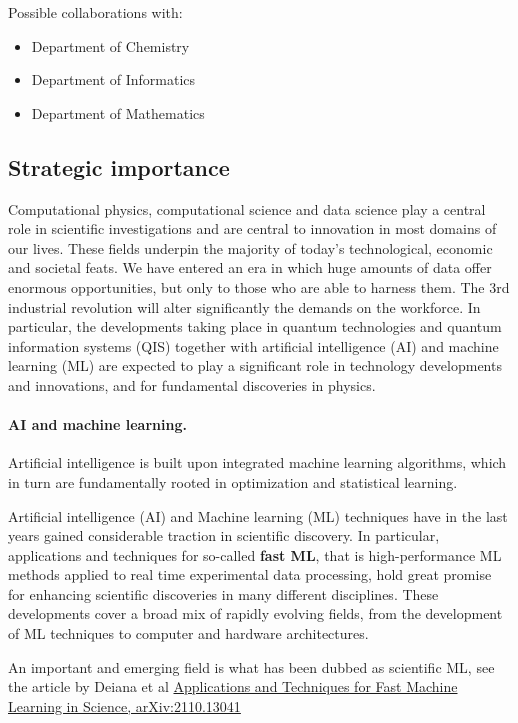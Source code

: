 \documentclass[%
oneside,                 %
final,                   %
10pt]{article}
\begin{document}
Possible collaborations with:

\begin{itemize}
\item Department of Chemistry

\item Department of Informatics

\item Department of Mathematics
\end{itemize}

\noindent
\subsection{Strategic importance}

Computational physics, computational science and data science play a
central role in scientific investigations and are central to
innovation in most domains of our lives. These fields underpin the
majority of today's technological, economic and societal feats. We
have entered an era in which huge amounts of data offer enormous
opportunities, but only to those who are able to harness them. The 3rd
industrial revolution will alter significantly the demands on the
workforce. In particular, the developments taking place in quantum
technologies and quantum information systems (QIS) together with
artificial intelligence (AI) and machine learning (ML) are expected to
play a significant role in technology developments and innovations,
and for fundamental discoveries in physics.

\paragraph{AI and machine learning.}
Artificial
intelligence is built upon integrated machine learning algorithms,
which in turn are fundamentally rooted in optimization and statistical
learning.

Artificial intelligence (AI) and Machine learning (ML)  techniques
have in the last years gained considerable traction in
scientific discovery. In particular, applications and techniques for
so-called \textbf{fast ML}, that is high-performance ML methods applied
to real time experimental data processing, hold great promise for
enhancing scientific discoveries in many different disciplines.
These developments cover a broad mix of rapidly
evolving fields, from the development of ML techniques to computer and
hardware architectures.

An important and emerging field is what has been dubbed as scientific ML, see the article by Deiana et al \href{{https://arxiv.org/abs/2110.13041}}{Applications and Techniques for Fast Machine Learning in Science, arXiv:2110.13041}
\end{document}

